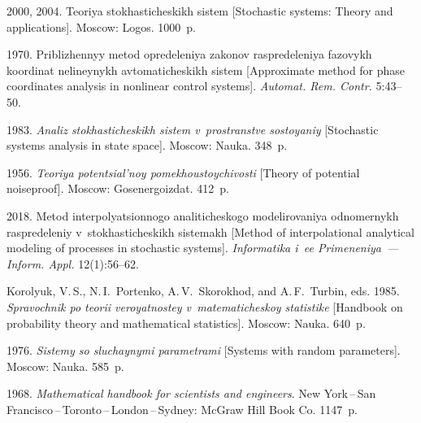   \begin{multicols}{2}

\renewcommand{\bibname}{\protect\rmfamily References}

{\small\frenchspacing
 {%
 \begin{thebibliography}{9}

 2000, 2004.
Teoriya stokhasticheskikh sistem [Stochastic systems: Theory and  applications]. 
Moscow: Logos. 1000~p.  %

 1970.
Priblizhennyy metod opredeleniya zakonov raspredeleniya fazovykh koordinat 
nelineynykh avtomaticheskikh sistem [Approximate method for phase coordinates 
analysis in nonlinear control systems]. 
\textit{Automat. Rem. Contr.}
5:43--50.

 1983.
\textit{Analiz sto\-kha\-sti\-che\-skikh sistem v~prostranstve sostoyaniy} [Stochastic 
systems analysis in state space]. Moscow: Nauka. 348~p.

 1956.
\textit{Teoriya potentsial'noy po\-me\-kho\-us\-toy\-chi\-vosti} [Theory of potential noiseproof]. 
Moscow: Gosenergoizdat. 412~p.

 2018. Metod interpolyatsionnogo ana\-li\-ti\-che\-sko\-go 
modelirovaniya odnomernykh raspredeleniy v~stokhasticheskikh sistemakh 
[Method of interpolational analytical modeling of processes in stochastic systems]. 
\textit{Informatika i~ee Primeneniya~--- Inform. Appl.} 12(1):56--62.

Korolyuk, V.\,S., N.\,I.~Portenko, A.\,V.~Skorokhod, and A.\,F.~Turbin, eds. 1985.
\textit{Spravochnik po teorii veroyatnostey v~matematicheskoy statistike}
[Handbook on probability theory and mathematical statistics]. 
 Moscow: Nauka. 640~p.
 
 1976.
\textit{Sistemy so sluchaynymi parametrami} [Systems with random parameters]. Moscow:
Nauka.  585~p.

 1968.
\textit{Mathematical handbook for scientists and engineers}. 
New York\,--\,San Francisco\,--\,Toronto\,--\,London\,--\,Sydney:
McGraw Hill Book Co. 1147~p.
\end{thebibliography}

 }
 }

\end{multicols}

